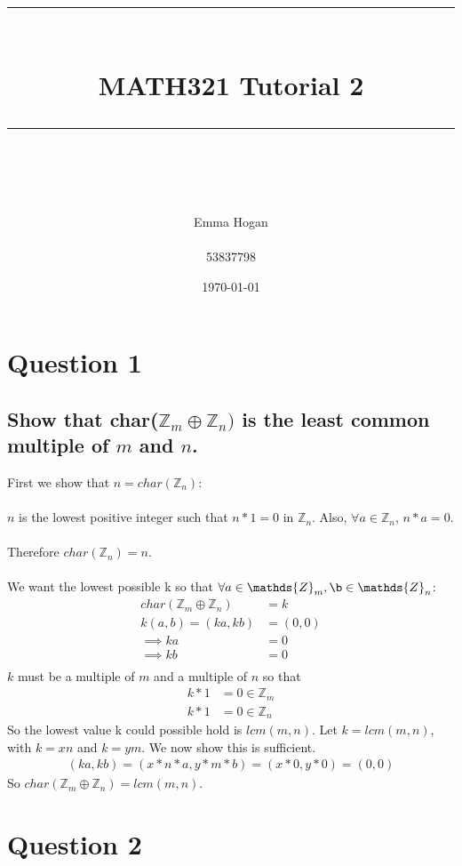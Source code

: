 \documentclass{article}
\title{	
	\normalfont\normalsize
	\vspace{25pt} %
	\rule{\linewidth}{0.5pt}\\ %
	\vspace{20pt} %
	{\huge MATH321 Tutorial 2}\\ %
	\vspace{12pt} %
	\rule{\linewidth}{2pt}\\ %
	\vspace{12pt} %
}
\author{\LARGE Emma Hogan \\\\53837798} %
\date{\normalsize\today} %
\begin{document}
\begin{titlepage}
\maketitle
\thispagestyle{empty}
\end{titlepage}
\section*{Question 1}
\subsection*{Show that char(\(\mathds{Z}_m \oplus \mathds{Z}_n)\) is the least common multiple of \(m\) and \(n\).}
First we show that \(n = char(\mathds{Z}_n)\):
\\\\
\(n\) is the lowest positive integer such that \(n*1 = 0\) in \(\mathds{Z}_n\). Also, \(\forall a \in \mathds{Z}_n\), \(n*a = 0\).
\\\\
Therefore \(char(\mathds{Z}_n) = n\).
\\\\
We want the lowest possible k so that \(\forall a \in \mathds{Z}_m, \b \in \mathds{Z}_n\):
\begin{align*}
char(\mathds{Z}_m \oplus \mathds{Z}_n) &= k\\
k(a,b) = (ka,kb) &= (0,0)\\
\implies ka &= 0\\
\implies kb &= 0\\
\end{align*}
\(k\) must be a multiple of \(m\) and a multiple of \(n\) so that
\begin{align*}
k*1 &= 0 \in \mathds{Z}_m\\
k*1 &= 0 \in \mathds{Z}_n
\end{align*}
So the lowest value k could possible hold is \(lcm(m,n)\).  Let \(k = lcm(m,n)\), with \(k = xn\) and \(k = ym\). We now show this is sufficient.
\begin{align*}
(ka, kb) = (x*n*a,y*m*b) = (x*0, y*0) = (0,0)
\end{align*}
So \(char(\mathds{Z}_m \oplus \mathds{Z}_n) = lcm(m,n)\).
\section*{Question 2}
\end{document}
